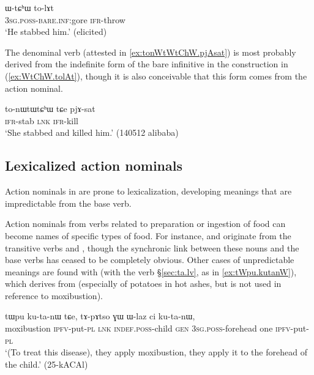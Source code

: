 \begin{exe}
\ex \label{ex:WtChW.tolAt}
\gll  ɯ-tɕʰɯ to-lɤt \\
\textsc{3sg}.\textsc{poss}-\textsc{bare}.\textsc{inf}:gore \textsc{ifr}-throw \\
\glt `He stabbed him.' (elicited)
\end{exe}

The denominal verb  (attested in \ref{ex:tonWtWtChW.pjAsat}) is most probably derived from the indefinite form  of the bare infinitive in the construction in (\ref{ex:WtChW.tolAt}), though it is also conceivable that this form comes from the action nominal.

\begin{exe}
\ex \label{ex:tonWtWtChW.pjAsat}
\gll  to-nɯtɯtɕʰɯ tɕe pjɤ-sat \\
\textsc{ifr}-stab \textsc{lnk} \textsc{ifr}-kill \\
\glt `She stabbed and killed him.' (140512 alibaba) 
\end{exe}

\subsection{Lexicalized action nominals}  \label{sec:lexicalized.action.nominals}
Action nominals in  are prone to lexicalization, developing meanings that are impredictable from the base verb.

Action nominals from verbs related to preparation or ingestion of food can become names of specific types of food. For instance,  and  originate from the transitive verbs  and , though the synchronic link between these nouns and the base verbs has ceased to be completely obvious. Other cases of unpredictable meanings are found with  (with the verb  §\ref{sec:ta.lv}, as in \ref{ex:tWpu.kutanW}), which derives from  (especially of potatoes in hot ashes, but is not used in reference to moxibustion).

\begin{exe}
\ex \label{ex:tWpu.kutanW}
\gll tɯpu ku-ta-nɯ tɕe, tɤ-pɤtso ɣɯ ɯ-laz ci ku-ta-nɯ, \\
moxibustion \textsc{ipfv}-put-\textsc{pl} \textsc{lnk} \textsc{indef}.\textsc{poss}-child \textsc{gen} \textsc{3sg}.\textsc{poss}-forehead one \textsc{ipfv}-put-\textsc{pl} \\
\glt `(To treat this disease), they apply moxibustion, they apply it to the forehead of the child.' (25-kACAl)	
\end{exe}

